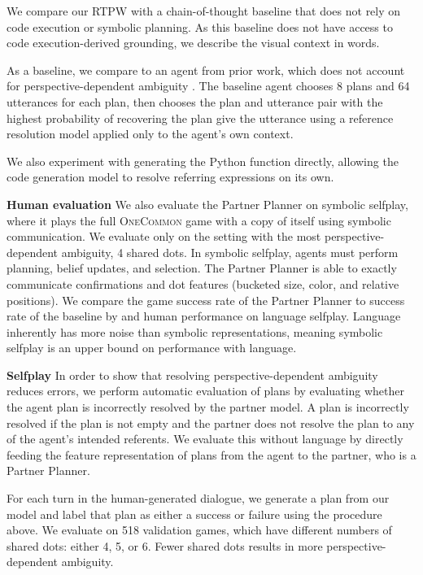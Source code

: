 \documentclass[11pt]{article}
\newcommand{\system}{RTPW}
\begin{document}
We compare our \system{} with a chain-of-thought baseline
that does not rely on code execution or symbolic planning.
As this baseline does not have access to code execution-derived grounding,
we describe the visual context in words.

As a baseline, we compare to an agent from prior work, which does not account for
perspective-dependent ambiguity \citep{fried}.
The baseline agent chooses 8 plans and 64 utterances for each plan, then chooses the
plan and utterance pair with the highest probability of recovering the plan give
the utterance using a reference resolution model applied only to the agent's own context.

We also experiment with generating the Python function directly,
allowing the code generation model to resolve referring expressions on its own.

\textbf{Human evaluation}
We also evaluate the Partner Planner on symbolic selfplay,
where it plays the full \textsc{OneCommon} game with a copy of itself using symbolic communication.
We evaluate only on the setting with the most perspective-dependent ambiguity, 4 shared dots.
In symbolic selfplay, agents must perform planning, belief updates, and selection.
The Partner Planner is able to exactly communicate confirmations and dot features (bucketed size, color, and relative positions).
We compare the game success rate of the Partner Planner to success rate of the baseline by \cite{fried} and human performance on language selfplay.
Language inherently has more noise than symbolic representations,
meaning symbolic selfplay is an upper bound on performance with language.


\textbf{Selfplay}
In order to show that resolving perspective-dependent
ambiguity reduces errors,
we perform automatic evaluation of plans by evaluating whether the agent plan is incorrectly resolved by the partner model.
A plan is incorrectly resolved if the plan is not empty and the partner does not resolve the plan to any
of the agent's intended referents.
We evaluate this without language by directly feeding the feature
representation of plans from the agent to the partner, who is a Partner Planner.

For each turn in the human-generated dialogue, we generate a plan from our model
and label that plan as either a success or failure using the procedure above.
We evaluate on 518 validation games, which have different numbers of shared dots: either 4, 5, or 6.
Fewer shared dots results in more perspective-dependent ambiguity.
\end{document}
